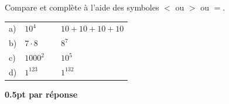 
\question[2]
Compare et complète à l'aide des symboles $<$ ou $>$ ou $=$.

\vspace{10pt}\def\arraystretch{2}
\begin{tabularx}{0.8\linewidth}{l>{\raggedleft\arraybackslash}p{1cm}cX}
a)&$10^4$&\sol{\bl[20mm]}{>}&$10+10+10+10$\\
b)&$7 \cdot 8$&\sol{\bl[20mm]}{<}&$8^7$\\
c)&$1000^2$&\sol{\bl[20mm]}{=}&$10^5$\\
d)&$1^{123}$&\sol{\bl[20mm]}{=}&$1^{132}$\\
\end{tabularx}
\def\arraystretch{1}

\begin{solution}[0pt]
\textbf{0.5pt par réponse}
\end{solution}
